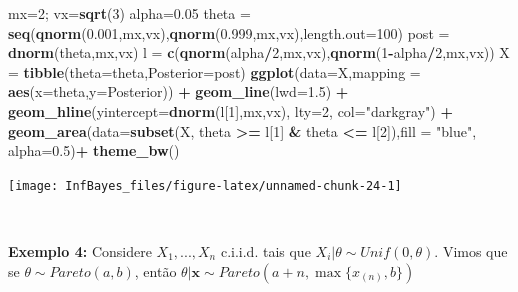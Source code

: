 \documentclass[
]{book}
\newenvironment{Shaded}{\begin{snugshade}}{\end{snugshade}}
\newcommand{\DataTypeTok}[1]{\textcolor[rgb]{0.13,0.29,0.53}{#1}}
\newcommand{\DecValTok}[1]{\textcolor[rgb]{0.00,0.00,0.81}{#1}}
\newcommand{\FloatTok}[1]{\textcolor[rgb]{0.00,0.00,0.81}{#1}}
\newcommand{\KeywordTok}[1]{\textcolor[rgb]{0.13,0.29,0.53}{\textbf{#1}}}
\newcommand{\NormalTok}[1]{#1}
\newcommand{\OperatorTok}[1]{\textcolor[rgb]{0.81,0.36,0.00}{\textbf{#1}}}
\newcommand{\StringTok}[1]{\textcolor[rgb]{0.31,0.60,0.02}{#1}}
\begin{document}
\begin{Shaded}
\begin{Highlighting}[]
\NormalTok{mx=}\DecValTok{2}\NormalTok{; vx=}\KeywordTok{sqrt}\NormalTok{(}\DecValTok{3}\NormalTok{)}
\NormalTok{alpha=}\FloatTok{0.05}
\NormalTok{theta =}\StringTok{ }\KeywordTok{seq}\NormalTok{(}\KeywordTok{qnorm}\NormalTok{(}\FloatTok{0.001}\NormalTok{,mx,vx),}\KeywordTok{qnorm}\NormalTok{(}\FloatTok{0.999}\NormalTok{,mx,vx),}\DataTypeTok{length.out=}\DecValTok{100}\NormalTok{)}
\NormalTok{post =}\StringTok{ }\KeywordTok{dnorm}\NormalTok{(theta,mx,vx)}
\NormalTok{l =}\StringTok{ }\KeywordTok{c}\NormalTok{(}\KeywordTok{qnorm}\NormalTok{(alpha}\OperatorTok{/}\DecValTok{2}\NormalTok{,mx,vx),}\KeywordTok{qnorm}\NormalTok{(}\DecValTok{1}\OperatorTok{-}\NormalTok{alpha}\OperatorTok{/}\DecValTok{2}\NormalTok{,mx,vx))}
\NormalTok{X =}\StringTok{ }\KeywordTok{tibble}\NormalTok{(}\DataTypeTok{theta=}\NormalTok{theta,}\DataTypeTok{Posterior=}\NormalTok{post)}
\KeywordTok{ggplot}\NormalTok{(}\DataTypeTok{data=}\NormalTok{X,}\DataTypeTok{mapping =} \KeywordTok{aes}\NormalTok{(}\DataTypeTok{x=}\NormalTok{theta,}\DataTypeTok{y=}\NormalTok{Posterior)) }\OperatorTok{+}
\StringTok{  }\KeywordTok{geom_line}\NormalTok{(}\DataTypeTok{lwd=}\FloatTok{1.5}\NormalTok{) }\OperatorTok{+}
\StringTok{  }\KeywordTok{geom_hline}\NormalTok{(}\DataTypeTok{yintercept=}\KeywordTok{dnorm}\NormalTok{(l[}\DecValTok{1}\NormalTok{],mx,vx), }\DataTypeTok{lty=}\DecValTok{2}\NormalTok{, }\DataTypeTok{col=}\StringTok{"darkgray"}\NormalTok{) }\OperatorTok{+}
\StringTok{  }\KeywordTok{geom_area}\NormalTok{(}\DataTypeTok{data=}\KeywordTok{subset}\NormalTok{(X, theta }\OperatorTok{>=}\StringTok{ }\NormalTok{l[}\DecValTok{1}\NormalTok{] }\OperatorTok{&}\StringTok{ }\NormalTok{theta }\OperatorTok{<=}\StringTok{ }\NormalTok{l[}\DecValTok{2}\NormalTok{]),}\DataTypeTok{fill =} \StringTok{"blue"}\NormalTok{, }\DataTypeTok{alpha=}\FloatTok{0.5}\NormalTok{)}\OperatorTok{+}
\StringTok{  }\KeywordTok{theme_bw}\NormalTok{()}
\end{Highlighting}
\end{Shaded}

\begin{center}\texttt{[image: InfBayes\_files/figure-latex/unnamed-chunk-24-1]} \end{center}

\(~\)

\textbf{Exemplo 4:} Considere \(X_1,...,X_n\) c.i.i.d. tais que \(X_i|\theta\sim Unif(0,\theta)\). Vimos que se \(\theta\sim Pareto(a,b)\), então \(\theta|\boldsymbol x\sim Pareto (a+n,\max\{x_{(n)},b\})\)
\end{document}
